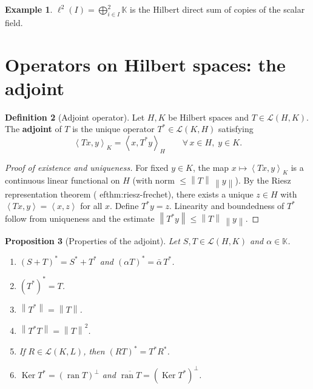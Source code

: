 \documentclass[a4paper,12pt]{book}
\DeclareMathOperator{\Ker}{Ker}
\DeclareMathOperator{\ran}{ran}
\newcommand{\K}{\mathbb{K}}
\newcommand{\norm}[1]{\left\| #1 \right\|}
\newcommand{\inner}[2]{\left\langle #1, #2 \right\rangle}
\theoremstyle{definition}
\newtheorem{definition}{Definition}[chapter]
\newtheorem{example}[definition]{Example}
\theoremstyle{plain}
\newtheorem{proposition}[definition]{Proposition}
\theoremstyle{remark}
\begin{document}
\begin{example}
$\ell^2(I) = \bigoplus_{i\in I}^2 \K$ is the Hilbert direct sum of
copies of the scalar field.
\end{example}

\section{Operators on Hilbert spaces: the adjoint}
\label{sec:adjoint}

\begin{definition}[Adjoint operator]
\label{def:adjoint}
Let $H,K$ be Hilbert spaces and $T\in\mathcal{L}(H,K)$.  The
\textbf{adjoint} of $T$ is the unique operator $T^*\in\mathcal{L}(K,H)$
satisfying
\[
  \inner{Tx}{y}_K = \inner{x}{T^* y}_H
  \qquad\forall\, x\in H,\; y\in K.
\]
\end{definition}

\begin{proof}[Proof of existence and uniqueness]
For fixed $y\in K$, the map $x\mapsto\inner{Tx}{y}_K$ is a continuous
linear functional on $H$ (with norm $\le\norm{T}\,\norm{y}$).  By the
Riesz representation theorem (
ef{thm:riesz-frechet}), there exists a
unique $z\in H$ with $\inner{Tx}{y}=\inner{x}{z}$ for all $x$.  Define
$T^*y=z$.  Linearity and boundedness of $T^*$ follow from uniqueness
and the estimate $\norm{T^*y}\le\norm{T}\,\norm{y}$.
\end{proof}

\begin{proposition}[Properties of the adjoint]
\label{prop:adjoint-props}
Let $S,T\in\mathcal{L}(H,K)$ and $\alpha\in\K$.
\begin{enumerate}[label=\textup{(\roman*)}]
  \item $(S+T)^*=S^*+T^*$ and $(\alpha T)^*=\bar\alpha\, T^*$.
  \item $(T^*)^*=T$.
  \item $\norm{T^*}=\norm{T}$.
  \item $\norm{T^*T}=\norm{T}^2$.
  \item If $R\in\mathcal{L}(K,L)$, then $(RT)^*=T^*R^*$.
  \item $\Ker T^* = (\ran T)^\perp$ and $\overline{\ran T}=(\Ker T^*)^\perp$.
\end{enumerate}
\end{proposition}
\end{document}
